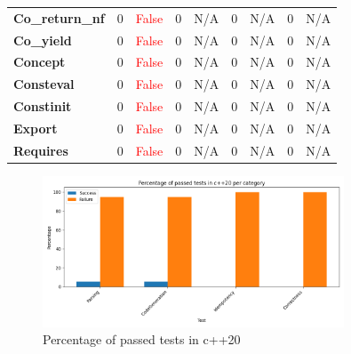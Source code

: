 \documentclass{article}
\begin{document}
\begin{xltabular}{\textwidth}{lcccccccc}
\textbf{{\fontsize{10}{12}\selectfont Co\_return\_nf}}& 0&\textcolor{red}{False}& 0&N/A& 0&N/A& 0&N/A \\[0.5ex]
\textbf{{\fontsize{10}{12}\selectfont Co\_yield}}& 0&\textcolor{red}{False}& 0&N/A& 0&N/A& 0&N/A \\[0.5ex]
\textbf{{\fontsize{10}{12}\selectfont Concept}}& 0&\textcolor{red}{False}& 0&N/A& 0&N/A& 0&N/A \\[0.5ex]
\textbf{{\fontsize{10}{12}\selectfont Consteval}}& 0&\textcolor{red}{False}& 0&N/A& 0&N/A& 0&N/A \\[0.5ex]
\textbf{{\fontsize{10}{12}\selectfont Constinit}}& 0&\textcolor{red}{False}& 0&N/A& 0&N/A& 0&N/A \\[0.5ex]
\textbf{{\fontsize{10}{12}\selectfont Export}}& 0&\textcolor{red}{False}& 0&N/A& 0&N/A& 0&N/A \\[0.5ex]
\textbf{{\fontsize{10}{12}\selectfont Requires}}& 0&\textcolor{red}{False}& 0&N/A& 0&N/A& 0&N/A \\[0.5ex]
\bottomrule
\end{xltabular}
\newpage
\begin{figure}[h!]
\centering
\includegraphics[width=0.8\textwidth]{../reports/artisan/images/c++20_percentage.png}
\caption{Percentage of passed tests in c++20}
\label{fig:c++20_percentage}
\end{figure}
\newpage
\end{document}
